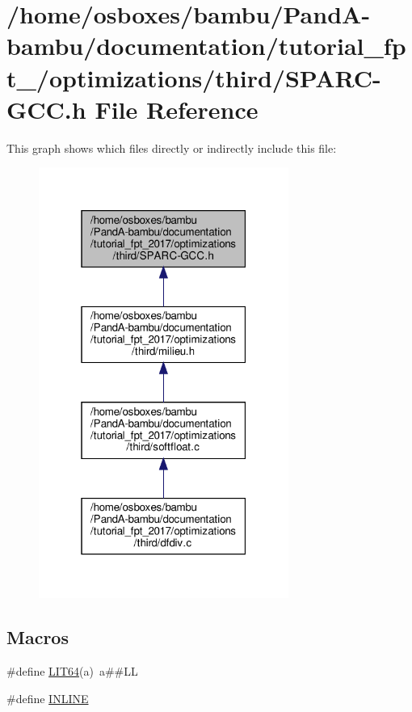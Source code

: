\hypertarget{tutorial__fpt__2017_2optimizations_2third_2SPARC-GCC_8h}{}\section{/home/osboxes/bambu/\+Pand\+A-\/bambu/documentation/tutorial\+\_\+fpt\+\_/optimizations/third/\+S\+P\+A\+R\+C-\/\+G\+CC.h File Reference}
\label{tutorial__fpt__2017_2optimizations_2third_2SPARC-GCC_8h}
This graph shows which files directly or indirectly include this file\+:
\nopagebreak
\begin{figure}[H]
\begin{center}
\leavevmode
\includegraphics[width=232pt]{db/dae/tutorial__fpt__2017_2optimizations_2third_2SPARC-GCC_8h__dep__incl}
\end{center}
\end{figure}
\subsection*{Macros}
\begin{DoxyCompactItemize}
\item 
\#define \hyperlink{tutorial__fpt__2017_2optimizations_2third_2SPARC-GCC_8h_a575f5a619c8e7d71c338c70a2b4e25a5}{L\+I\+T64}(a)~a\#\#LL
\item 
\#define \hyperlink{tutorial__fpt__2017_2optimizations_2third_2SPARC-GCC_8h_a2eb6f9e0395b47b8d5e3eeae4fe0c116}{I\+N\+L\+I\+NE}
\end{DoxyCompactItemize}
